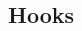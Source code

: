 \documentclass[a4paper, 8pt]{extarticle}
\begin{document}
\begin{multicols*}{3}
				\subsection{Hooks}

\end{multicols*}
\end{document}

